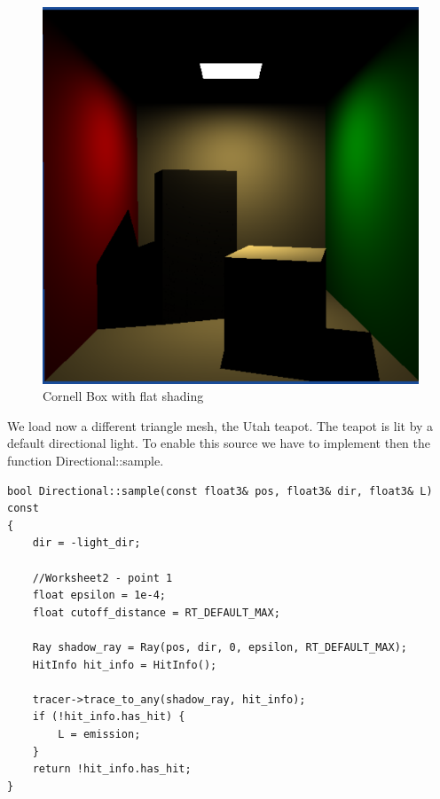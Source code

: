 \begin{figure}[H]
	\centering
	\includegraphics[scale=\imagescale]{images/worksheet_4/part3_after_rendering}
	\caption{Cornell Box with flat shading}
	\label{fig:cornell_lambertian_shading}
\end{figure}
We load now a different triangle mesh, the Utah teapot. The teapot is lit by a default directional light. To enable this source we have to implement then the function Directional::sample.
\begin{lstlisting}
bool Directional::sample(const float3& pos, float3& dir, float3& L) const
{
	dir = -light_dir;
	
	//Worksheet2 - point 1
	float epsilon = 1e-4;
	float cutoff_distance = RT_DEFAULT_MAX;
	
	Ray shadow_ray = Ray(pos, dir, 0, epsilon, RT_DEFAULT_MAX);
	HitInfo hit_info = HitInfo();
	
	tracer->trace_to_any(shadow_ray, hit_info);
	if (!hit_info.has_hit) {
		L = emission;
	}
	return !hit_info.has_hit;
}
\end{lstlisting}

